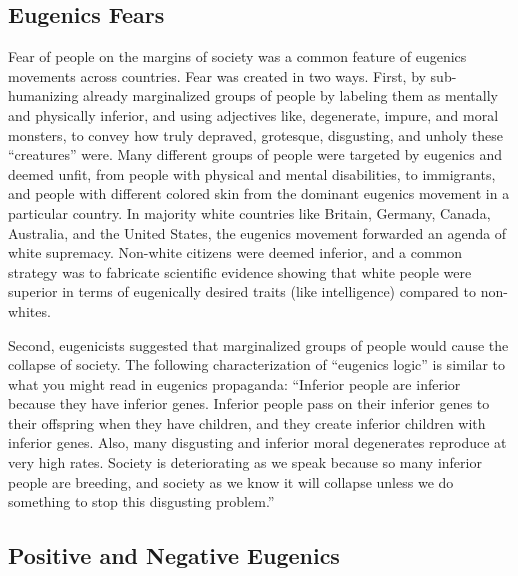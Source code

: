 \documentclass[
  oneside,
  12pt]{crumpbook}
\begin{document}
\hypertarget{eugenics-fears}{%
\subsection{Eugenics Fears}\label{eugenics-fears}}

Fear of people on the margins of society was a common feature of eugenics movements across countries. Fear was created in two ways. First, by sub-humanizing already marginalized groups of people by labeling them as mentally and physically inferior, and using adjectives like, degenerate, impure, and moral monsters, to convey how truly depraved, grotesque, disgusting, and unholy these ``creatures'' were. Many different groups of people were targeted by eugenics and deemed unfit, from people with physical and mental disabilities, to immigrants, and people with different colored skin from the dominant eugenics movement in a particular country. In majority white countries like Britain, Germany, Canada, Australia, and the United States, the eugenics movement forwarded an agenda of white supremacy. Non-white citizens were deemed inferior, and a common strategy was to fabricate scientific evidence showing that white people were superior in terms of eugenically desired traits (like intelligence) compared to non-whites.

Second, eugenicists suggested that marginalized groups of people would cause the collapse of society. The following characterization of ``eugenics logic'' is similar to what you might read in eugenics propaganda: ``Inferior people are inferior because they have inferior genes. Inferior people pass on their inferior genes to their offspring when they have children, and they create inferior children with inferior genes. Also, many disgusting and inferior moral degenerates reproduce at very high rates. Society is deteriorating as we speak because so many inferior people are breeding, and society as we know it will collapse unless we do something to stop this disgusting problem.''

\hypertarget{positive-and-negative-eugenics}{%
\subsection{Positive and Negative Eugenics}\label{positive-and-negative-eugenics}}
\end{document}
